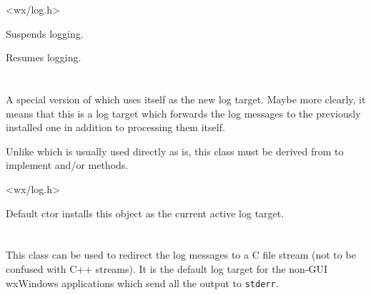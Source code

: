 


<wx/log.h>




Suspends logging.


Resumes logging.


\section{}\label{wxlogpassthrough}

A special version of  which uses itself as the
new log target. Maybe more clearly, it means that this is a log target which
forwards the log messages to the previously installed one in addition to
processing them itself.

Unlike  which is usually used directly as is,
this class must be derived from to implement  
and/or  methods.




<wx/log.h>


\label{wxlogpassthroughctor}

Default ctor installs this object as the current active log target.


\section{}\label{wxlogstderr}

This class can be used to redirect the log messages to a C file stream (not to
be confused with C++ streams). It is the default log target for the non-GUI
wxWindows applications which send all the output to {\tt stderr}.

